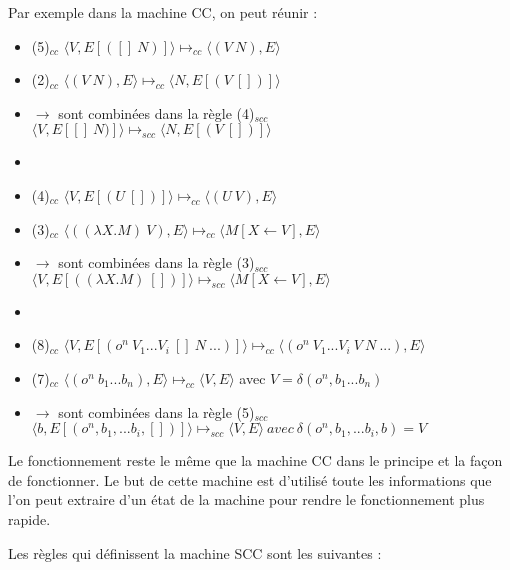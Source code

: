 \documentclass[10pt,a4paper]{report}
\begin{document}
Par exemple dans la machine CC, on peut réunir :

\begin{itemize}
\item[] (5)$_{cc}$ $\langle V,E[([]~N)]\rangle \longmapsto_{cc} \langle(V~N),E\rangle$
\item[] (2)$_{cc}$ $\langle(V~N),E\rangle \longmapsto_{cc}  \langle N,E[(V~[])]\rangle$
\item[] $\rightarrow$ sont combinées dans la règle (4)$_{scc}$ $ \langle V,E[[]~N)]\rangle \longmapsto_{scc} \langle N,E[(V~[])]\rangle$
\item[]
\item[] (4)$_{cc}$ $\langle V,E[(U~[])]\rangle \longmapsto_{cc} \langle(U~V),E\rangle$
\item[]	(3)$_{cc}$ $\langle((\lambda X.M)~V),E\rangle \longmapsto_{cc} \langle M[X\longleftarrow V],E\rangle$
\item[] $\rightarrow$ sont combinées dans la règle (3)$_{scc}$ $\langle V,E[((\lambda X.M)~[])]\rangle \longmapsto_{scc} \langle M[X\leftarrow V],E\rangle$
\item[]
\item[] (8)$_{cc}$ $\langle V,E[(o^{n}~V_{1}...V_{i}~[]~N~...)]\rangle \longmapsto_{cc} \langle(o^{n}~V_{1}...V_{i}~V~N ~...),E\rangle$ 
\item[] (7)$_{cc}$ $\langle(o^{n}~b_{1}...b_{n}),E\rangle \longmapsto_{cc}  \langle V,E\rangle$ avec $V = \delta(o^{n},b_{1}...b_{n})$ 
\item[] $\rightarrow$ sont combinées dans la règle (5)$_{scc}$ $\langle b,E[(o^{n},b_{1},...b_{i},[])]\rangle \longmapsto_{scc} \langle V,E\rangle~avec~\delta
  (o^{n},b_{1},...b_{i},b)=V$
\end{itemize}
\medbreak

Le fonctionnement reste le même que la machine CC dans le principe et la façon de fonctionner. Le but de cette machine est d'utilisé toute les informations que l'on peut extraire d'un état de la machine pour rendre le fonctionnement plus rapide.
\bigbreak


Les règles qui définissent la machine SCC sont les suivantes :
\end{document}
